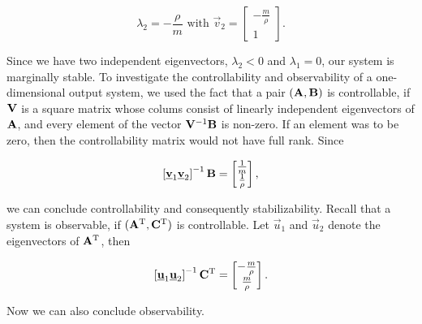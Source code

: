 \documentclass[11pt,titlepage]{report}
\begin{document}
\begin{equation}
	\lambda_2 = -\frac{\rho}{m}\text{ with }
	\vec{v}_2 = \begin{bmatrix}
		-\frac{m}{\rho} \\
		1
	\end{bmatrix}.
\end{equation}

Since we have two independent eigenvectors, $\lambda_2 < 0$ and $\lambda_1 = 0$, our system is marginally stable. To investigate the controllability and observability of a one-dimensional output system, we used the fact that a pair $(\mathbf{A},\mathbf{B})$ is controllable, if $\mathbf{V}$ is a square matrix whose colums consist of linearly independent eigenvectors of $\mathbf{A}$, and every element of the vector $\mathbf{V}^{-1} \mathbf{B}$ is non-zero. If an element was to be zero, then the controllability matrix would not have full rank. Since

\begin{equation}
	\left[\mathbf{\underline{v}}_1 \mathbf{\underline{v}}_2 \right]^{-1} \mathbf{B} = \begin{bmatrix}
		\frac{1}{m} \\
		\frac{1}{\rho}
	\end{bmatrix},
\end{equation}

we can conclude controllability and consequently stabilizability. Recall that a system is observable, if $(\mathbf{A}^{\text T},\mathbf{C}^{\text T})$ is controllable. Let $\vec{u}_1$ and $\vec{u}_2$ denote the eigenvectors of $\mathbf{A}^{\text T}$, then

\begin{equation}
	\left[\mathbf{\underline{u}}_1 \mathbf{\underline{u}}_2 \right]^{-1} \mathbf{C}^{\text T} = \begin{bmatrix}
		-\frac{m}{\rho} \\
		\frac{m}{\rho}
	\end{bmatrix}.
\end{equation}

Now we can also conclude observability.
\end{document}
